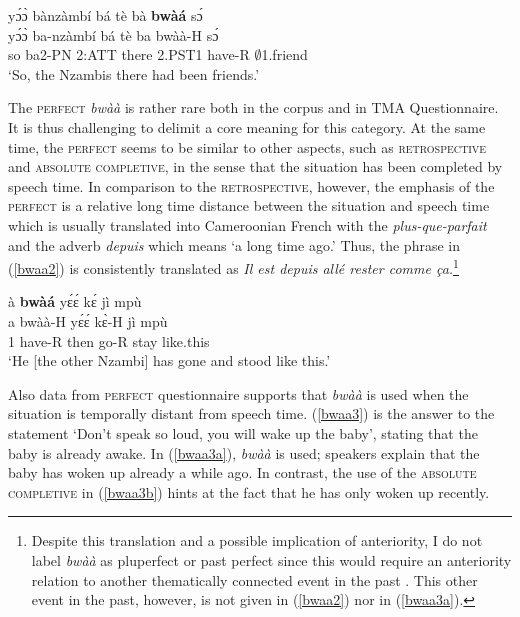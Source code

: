 \begin{exe} 
\ex\label{Pbwaa1}
  \glll  yɔ́ɔ̀ bànzàmbí bá tè bà {\bfseries bwàá} sɔ́ \\
         yɔ́ɔ̀ ba-nzàmbí bá tè ba bwàà-H sɔ́\\
            so ba2-PN 2:ATT there 2.PST1 have-R $\emptyset$1.friend  \\
    \trans `So, the Nzambis there had been friends.'
\end{exe}


The \textsc{perfect} {\itshape bwàà} is rather rare both in the corpus and in  TMA Questionnaire. It is thus challenging to delimit a core meaning for this category. At the same time, the \textsc{perfect} seems to be similar to other aspects, such as \textsc{retrospective} and \textsc{absolute completive},  in the sense that the situation has been completed by speech time. In comparison to the \textsc{retrospective}, however, the emphasis of the \textsc{perfect} is a relative long time distance between the situation and speech time which is usually translated into Cameroonian French with the {\itshape plus-que-parfait} and the adverb {\itshape depuis} which means `a long time ago.' Thus, the phrase in (\ref{bwaa2}) is consistently translated as {\itshape Il est depuis allé rester comme ça.}\footnote{Despite this translation and a possible implication of anteriority, I do not label {\itshape bwàà} as pluperfect or past perfect since this would require an anteriority  relation to another thematically connected event in the past \citep{lee2017}. This other event in the past, however, is not given in (\ref{bwaa2}) nor in (\ref{bwaa3a}).}

\begin{exe} 
\ex\label{bwaa2} 
  \glll à {\bfseries bwàá} yɛ́ɛ́ kɛ́ jì mpù \\
       a bwàà-H yɛ́ɛ́ kɛ̀-H jì mpù \\
        1 have-R then go-R stay like.this \\
    \trans `He [the other Nzambi] has gone and stood like this.'
\end{exe}


Also data from  \textsc{perfect} questionnaire supports that {\itshape bwàà} is used when the situation is temporally distant from speech time. (\ref{bwaa3}) is the answer to the statement `Don't speak so loud, you will wake up the baby', stating that the baby is already awake. In (\ref{bwaa3a}), {\itshape bwàà} is used; speakers explain that the baby has woken up already a while ago. In contrast, the use of the \textsc{absolute completive} in (\ref{bwaa3b}) hints at the fact that he has only woken up recently.

